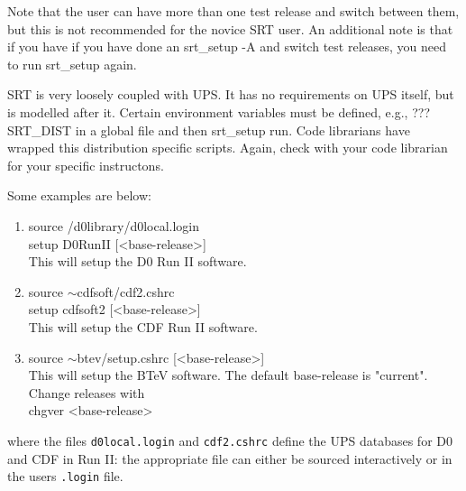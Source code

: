 \documentclass[12pt]{article}
\begin{document}
Note that the user can have more than one test release and switch between 
them, but this is not recommended for the novice SRT user. An additional note
is that if you have if you have done an srt\_setup -A and switch test 
releases, you need to run srt\_setup again. 

SRT is very loosely coupled with UPS. It has no requirements on UPS itself,
but is modelled after it. Certain environment variables must be defined, 
e.g., ??? SRT\_DIST in a global file and then srt\_setup run. Code librarians
have wrapped this distribution specific scripts. 
Again, check with your code librarian for your specific instructons. 

Some examples are below: 

\begin{enumerate}
\item {\ttfamily source /d0library/d0local.login }\\
{\ttfamily setup D0RunII [<base-release>]}\\
This will setup the D0 Run II software.  
\item {\ttfamily source $\sim$cdfsoft/cdf2.cshrc}\\
{\ttfamily setup cdfsoft2 [<base-release>]}\\
This will setup the CDF Run II software. \\
\item {\ttfamily source $\sim$btev/setup.cshrc} [<base-release>]\\
This will setup the BTeV software.  The default base-release is "current".
Change releases with\\
{\ttfamily chgver <base-release>} \\
\end{enumerate}

where the files \texttt{d0local.login} and 
\texttt{cdf2.cshrc} define the UPS databases for D0 and CDF in Run II:
the appropriate file can either be sourced 
interactively or in the users \texttt{.login} file.  
\end{document}
